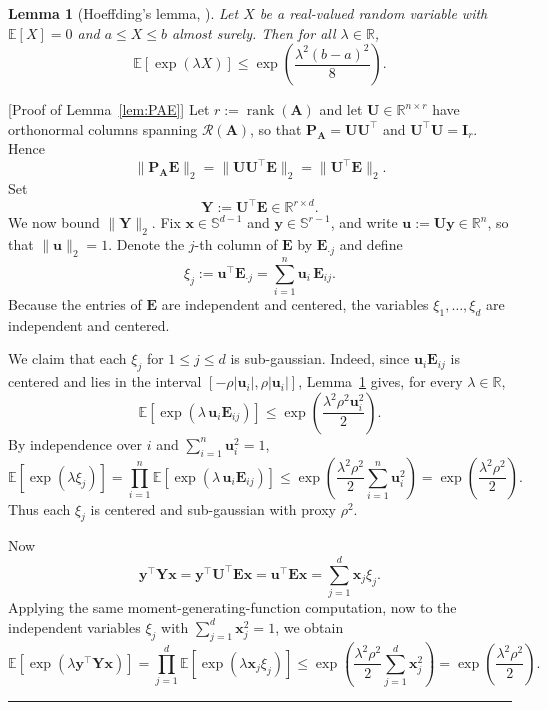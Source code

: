 \documentclass{article}
\newcommand{\twonorm}[1]{\|#1\|_2}
\newcommand{\Ex}[1]{\mbox{}\mathbb{E}\left[#1\right]}
\newcommand{\R}{\mathbb{R}} %
\newcommand{\ub}{\mathbf{u}}
\newcommand{\xb}{\mathbf{x}}
\newcommand{\yb}{\mathbf{y}}
\newcommand{\Ab}{\mathbf{A}}
\newcommand{\Eb}{\mathbf{E}}
\newcommand{\Ib}{\mathbf{I}}
\newcommand{\Pb}{\mathbf{P}}
\newcommand{\Ub}{\mathbf{U}}
\newcommand{\Yb}{\mathbf{Y}}
\newcommand{\BlackBox}{\rule{1.5ex}{1.5ex}}  %
\newenvironment{proof}{\par\noindent{\bf Proof\ }}{\hfill\BlackBox\par\medskip}
\newtheorem{lemma}{Lemma}[section]
\newcommand{\rank}{\mathop{\mathrm{rank}}}
\newcommand{\rbr}[1]{\left(#1\right)}
\newcommand{\abr}[1]{\left|#1\right|}
\begin{document}
\begin{lemma}[Hoeffding's lemma, {\citealp[Lemma~2.2]{Con_ineq_book}}]\label{lem:hoef}
Let $X$ be a real-valued random variable with $\Ex{X} = 0$ and $a \le X \le b$ almost surely. Then for all $\lambda \in \R$,
\begin{equation*}
    \Ex{\exp(\lambda X)} \le \exp\rbr{\frac{\lambda^2 (b-a)^2}{8}}.
\end{equation*}
\end{lemma}
\begin{proof}[Proof of Lemma~\ref{lem:PAE}]
Let $r := \rank(\Ab)$ and let $\Ub \in \R^{n \times r}$ have orthonormal columns spanning $\mathcal{R}(\Ab)$, so that $\Pb_\Ab = \Ub\Ub^\top$ and $\Ub^\top \Ub = \Ib_r$. Hence
\begin{equation*}
    \twonorm{\Pb_\Ab \Eb} = \twonorm{\Ub\Ub^\top \Eb} = \twonorm{\Ub^\top \Eb}.
\end{equation*}
Set
\begin{equation*}
    \Yb := \Ub^\top \Eb \in \R^{r \times d}.
\end{equation*}
We now bound $\twonorm{\Yb}$. Fix $\xb \in \mathbb{S}^{d-1}$ and $\yb \in \mathbb{S}^{r-1}$, and write $\ub := \Ub\yb \in \R^n$, so that $\twonorm{\ub} = 1$. Denote the $j$-th column of $\Eb$ by $\Eb_{\cdot j}$ and define
\begin{equation*}
    \xi_j := \ub^\top \Eb_{\cdot j} = \sum_{i=1}^{n} \ub_i \, \Eb_{ij}.
\end{equation*}
Because the entries of $\Eb$ are independent and centered, the variables $\xi_1, \dots, \xi_d$ are independent and centered.

We claim that each $\xi_j$ for $1 \le j \le d$ is sub-gaussian. Indeed, since $\ub_i \Eb_{ij}$ is centered and lies in the interval $[-\rho \abr{\ub_i}, \rho \abr{\ub_i}]$, Lemma~\ref{lem:hoef} gives, for every $\lambda \in \R$,
\begin{equation*}
    \Ex{\exp(\lambda \, \ub_i \Eb_{ij})} \le \exp\rbr{\frac{\lambda^2 \rho^2 \ub_i^2}{2}}.
\end{equation*}
By independence over $i$ and $\sum_{i=1}^{n} \ub_i^2 = 1$,
\begin{equation*}
    \Ex{\exp(\lambda \xi_j)}
    = \prod_{i=1}^{n} \Ex{\exp(\lambda \, \ub_i \Eb_{ij})}
    \le \exp\rbr{\frac{\lambda^2 \rho^2}{2} \sum_{i=1}^{n} \ub_i^2}
    = \exp\rbr{\frac{\lambda^2 \rho^2}{2}}.
\end{equation*}
Thus each $\xi_j$ is centered and sub-gaussian with proxy $\rho^2$.

Now
\begin{equation*}
    \yb^\top \Yb \xb = \yb^\top \Ub^\top \Eb \xb = \ub^\top \Eb \xb = \sum_{j=1}^{d} \xb_j \xi_j.
\end{equation*}
Applying the same moment-generating-function computation, now to the independent variables $\xi_j$ with $\sum_{j=1}^{d} \xb_j^2 = 1$, we obtain
\begin{equation*}
    \Ex{\exp(\lambda \yb^\top \Yb \xb)}
    = \prod_{j=1}^{d} \Ex{\exp(\lambda \xb_j \xi_j)}
    \le \exp\rbr{\frac{\lambda^2 \rho^2}{2} \sum_{j=1}^{d} \xb_j^2}
    = \exp\rbr{\frac{\lambda^2 \rho^2}{2}}.
\end{equation*}


\end{proof}
\end{document}
